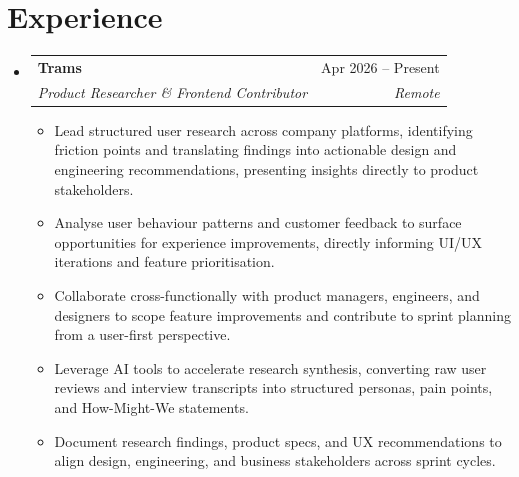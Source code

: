 \documentclass[11pt, letterpaper]{article}
\makeatletter
\newcommand{\resumeItem}[1]{%
  \item\small{#1\vspace{-1pt}}%
}
\newcommand{\resumeSubheading}[4]{%
  \vspace{4pt}\item[]%
  \begin{tabularx}{\linewidth}[t]{@{}X r@{}}
    \textbf{#1} & \small #2 \\[-1pt]
    \textit{\small #3} & \textit{\small #4} \\
  \end{tabularx}%
  \vspace{1pt}%
}
\newcommand{\resumeSubHeadingListStart}{%
  \begin{itemize}[leftmargin=0pt, label={}, itemsep=0pt, parsep=0pt, topsep=2pt]%
}
\newcommand{\resumeSubHeadingListEnd}{\end{itemize}\vspace{-4pt}}
\newcommand{\resumeItemListStart}{%
  \begin{itemize}[leftmargin=0.18in, itemsep=2pt, parsep=0pt, topsep=3pt]%
}
\newcommand{\resumeItemListEnd}{\end{itemize}\vspace{1pt}}
\makeatother
\begin{document}
\section{Experience}
\resumeSubHeadingListStart
  \resumeSubheading
    {Trams}{Apr 2026 -- Present}
    {Product Researcher \& Frontend Contributor}{Remote}
  \resumeItemListStart
    \resumeItem{Lead structured user research across company platforms, identifying friction points and translating findings into actionable design and engineering recommendations, presenting insights directly to product stakeholders.}
    \resumeItem{Analyse user behaviour patterns and customer feedback to surface opportunities for experience improvements, directly informing UI/UX iterations and feature prioritisation.}
    \resumeItem{Collaborate cross-functionally with product managers, engineers, and designers to scope feature improvements and contribute to sprint planning from a user-first perspective.}
    \resumeItem{Leverage AI tools to accelerate research synthesis, converting raw user reviews and interview transcripts into structured personas, pain points, and How-Might-We statements.}
    \resumeItem{Document research findings, product specs, and UX recommendations to align design, engineering, and business stakeholders across sprint cycles.}
  \resumeItemListEnd
\resumeSubHeadingListEnd
\end{document}
